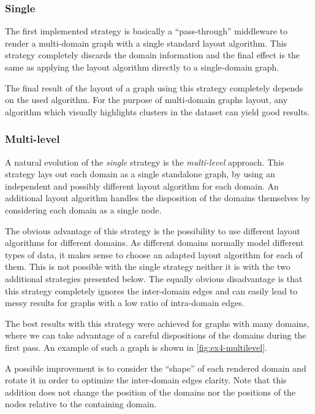 \subsubsection{Single}

The first implemented strategy is basically a ``pass-through'' middleware to render a multi-domain graph with a single standard layout algorithm. This strategy completely discards the domain information and the final effect is the same as applying the layout algorithm directly to a single-domain graph.

The final result of the layout of a graph using this strategy completely depends on the used algorithm. For the purpose of multi-domain graphs layout, any algorithm which visually highlights clusters in the dataset can yield good results.

\subsubsection{Multi-level}

A natural evolution of the \emph{single} strategy is the \emph{multi-level} approach. This strategy lays out each domain as a single standalone graph, by using an independent and possibly different layout algorithm for each domain. An additional layout algorithm handles the disposition of the domains themselves by considering each domain as a single node.

The obvious advantage of this strategy is the possibility to use different layout algorithms for different domains. As different domains normally model different types of data, it makes sense to choose an adapted layout algorithm for each of them. This is not possible with the single strategy neither it is with the two additional strategies presented below. The equally obvious disadvantage is that this strategy completely ignores the inter-domain edges and can easily lead to messy results for graphs with a low ratio of intra-domain edges.

The best results with this strategy were achieved for graphs with many domains, where we can take advantage of a careful dispositions of the domains during the first pass. An example of such a graph is shown in \vref{fig:ex4-multilevel}.

A possible improvement is to consider the ``shape'' of each rendered domain and rotate it in order to optimize the inter-domain edges clarity. Note that this addition does not change the position of the domains nor the positions of the nodes relative to the containing domain.

